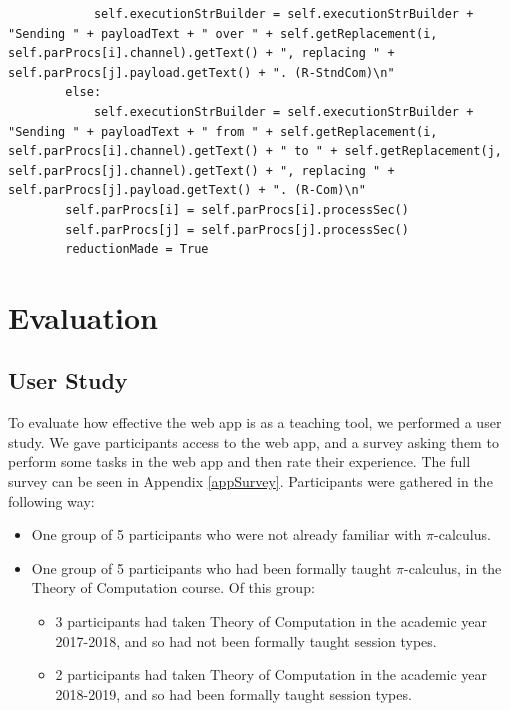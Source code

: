 \documentclass{l4proj}
\begin{document}
\begin{lstlisting}
			self.executionStrBuilder = self.executionStrBuilder + "Sending " + payloadText + " over " + self.getReplacement(i, self.parProcs[i].channel).getText() + ", replacing " + self.parProcs[j].payload.getText() + ". (R-StndCom)\n"
		else:
			self.executionStrBuilder = self.executionStrBuilder + "Sending " + payloadText + " from " + self.getReplacement(i, self.parProcs[i].channel).getText() + " to " + self.getReplacement(j, self.parProcs[j].channel).getText() + ", replacing " + self.parProcs[j].payload.getText() + ". (R-Com)\n"
		self.parProcs[i] = self.parProcs[i].processSec()
		self.parProcs[j] = self.parProcs[j].processSec()
		reductionMade = True
\end{lstlisting}

\chapter{Evaluation} 
\label{evaluation}

\section{User Study}
\label{evalStudy}

\quad To evaluate how effective the web app is as a teaching tool, we performed a user study. We gave participants access to the web app, and a survey asking them to perform some tasks in the web app and then rate their experience. The full survey can be seen in Appendix \ref{appSurvey}. Participants were gathered in the following way:
\begin{itemize}
    \item One group of 5 participants who were not already familiar with $\pi$-calculus.
    \item One group of 5 participants who had been formally taught $\pi$-calculus, in the Theory of Computation course. Of this group:
    \begin{itemize}
        \item 3 participants had taken Theory of Computation in the academic year 2017-2018, and so had not been formally taught session types.
        \item 2 participants had taken Theory of Computation in the academic year 2018-2019, and so had been formally taught session types.
    \end{itemize}
\end{itemize}
\end{document}
